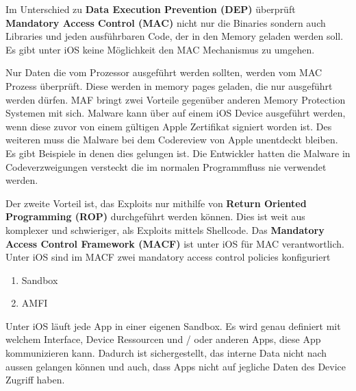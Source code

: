 Im Unterschied zu \textbf{Data Execution Prevention (DEP)} überprüft \textbf{Mandatory Access Control (MAC) } nicht nur die Binaries sondern auch Libraries und jeden ausführbaren Code, der in den Memory geladen werden soll. Es gibt unter iOS keine Möglichkeit den MAC Mechanismus zu umgehen. \par 
Nur Daten die vom Prozessor ausgeführt werden sollten, werden vom MAC Prozess überprüft. Diese werden in \glqq memory pages\grqq{} geladen, die nur ausgeführt werden dürfen. MAF bringt zwei Vorteile gegenüber anderen Memory Protection Systemen mit sich. Malware kann über auf einem iOS Device ausgeführt werden, wenn diese zuvor von einem gültigen Apple Zertifikat signiert worden ist. Des weiteren muss die Malware bei dem Codereview von Apple unentdeckt bleiben. Es gibt Beispiele in denen dies gelungen ist. Die Entwickler hatten die Malware in Codeverzweigungen \glqq versteckt \grqq{} die im normalen Programmfluss nie verwendet werden. \par 
Der zweite Vorteil ist, das Exploits nur mithilfe von \textbf{Return Oriented Programming (ROP)} durchgeführt werden können. Dies ist weit aus komplexer und schwieriger, als Exploits mittels Shellcode.
Das \textbf{Mandatory Access Control Framework (MACF)} ist unter iOS für MAC verantwortlich. Unter iOS sind im MACF zwei \glqq mandatory access control policies \grqq{} konfiguriert
\begin{enumerate}
  \item Sandbox
  \item AMFI
\end{enumerate}
Unter iOS läuft jede App in einer eigenen Sandbox. 
Es wird genau definiert mit welchem Interface, Device Ressourcen und / oder anderen Apps, diese App kommunizieren kann. Dadurch ist sichergestellt, das interne Data nicht nach aussen gelangen können und auch, dass Apps nicht auf jegliche Daten des Device Zugriff haben.








